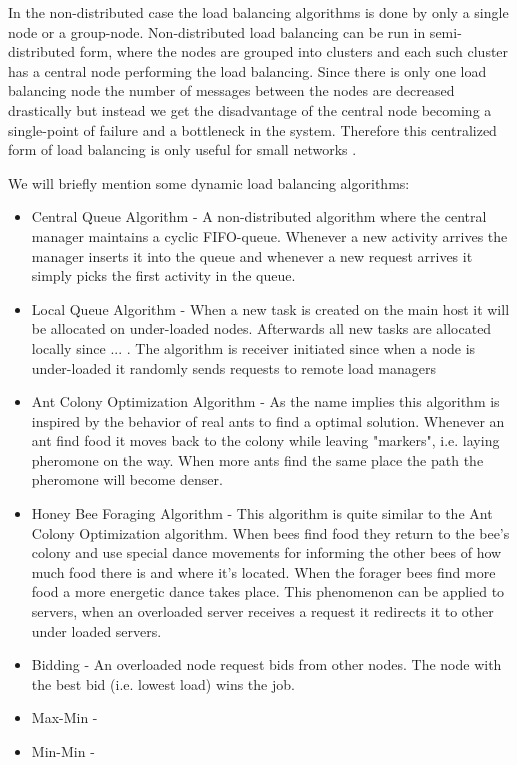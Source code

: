\documentclass{cslthse-msc}
\begin{document}
In the non-distributed case the load balancing algorithms is done by only a single node or a group-node. Non-distributed load balancing can be run in semi-distributed form, where the nodes are grouped into clusters and each such cluster has a central node performing the load balancing. Since there is only one load balancing node the number of messages between the nodes are decreased drastically but instead we get the disadvantage of the central node becoming a single-point of failure and a bottleneck in the system. Therefore this centralized form of load balancing is only useful for small networks \cite{perfAnalysisLoadCloud}.

We will briefly mention some dynamic load balancing algorithms: %

\begin{itemize}
\item Central Queue Algorithm - A non-distributed algorithm where the central manager maintains a cyclic FIFO-queue. Whenever a new activity arrives the manager inserts it into the queue and whenever a new request arrives it simply picks the first activity in the queue. 

\item Local Queue Algorithm - When a new task is created on the main host it will be allocated on under-loaded nodes. Afterwards all new tasks are allocated locally since ... \cite{perfAnalysisLoadCloud}. The algorithm is receiver initiated since when a node is under-loaded it randomly sends requests to remote load managers

\item Ant Colony Optimization Algorithm - As the name implies this algorithm is inspired by the behavior of real ants to find a optimal solution. Whenever an ant find food it moves back to the colony while leaving "markers", i.e. laying pheromone on the way. When more ants find the same place the path the pheromone will become denser. 

\item Honey Bee Foraging Algorithm - This algorithm is quite similar to the Ant Colony Optimization algorithm. When bees find food they return to the bee's colony and use special dance movements for informing the other bees of how much food there is and where it's located. When the forager bees find more food a more energetic dance takes place. This phenomenon can be applied to servers, when an overloaded server receives a request it redirects it to other under loaded servers.


\item Bidding - An overloaded node request bids from other nodes. The node with the best bid (i.e. lowest load) wins the job.

\item Max-Min - 

\item Min-Min - 
\end{itemize}
\end{document}
